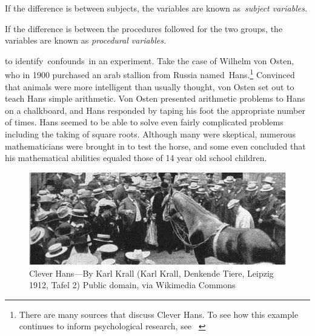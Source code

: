 \begin{refsection}
If the difference is between subjects, the variables are known as \emph{subject variables.}

If the difference is between the procedures followed for the two groups, the variables are known as \emph{procedural variables.}

 to identify confounds in an experiment. Take the case of Wilhelm von Osten, who in 1900 purchased an arab stallion from Russia named Hans.\footnote{There are many sources that discuss Clever Hans. To see how this example continues to inform psychological research, see ~\citep{DeSio:2014kp}} Convinced that animals were more intelligent than usually thought, von Osten set out to teach Hans simple arithmetic. Von Osten presented arithmetic problems to Hans on a chalkboard, and Hans responded by taping his foot the appropriate number of times. Hans seemed to be able to solve even fairly complicated problems including the taking of square roots. Although many were skeptical, numerous mathematicians were brought in to test the horse, and some even concluded that his mathematical abilities equaled those of 14 year old school children.

\begin{figure}\includegraphics{../images/CleverHans.jpg}\caption{Clever Hans---By Karl Krall (Karl Krall, Denkende Tiere, Leipzig 1912, Tafel 2) Public domain, via Wikimedia Commons}\label{fig:cleverhans}\end{figure}


\end{refsection}
